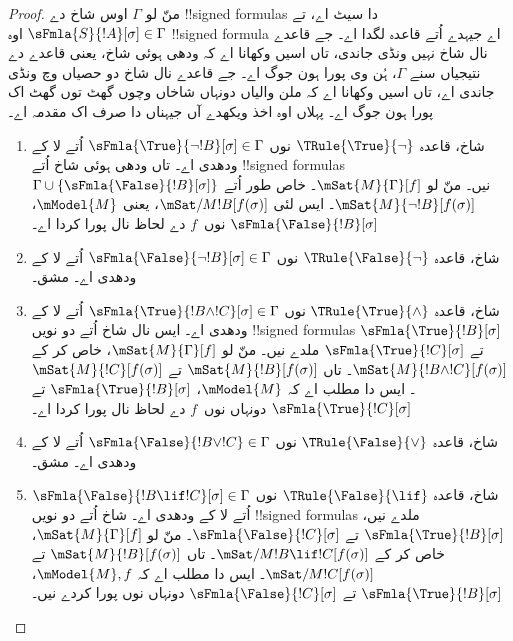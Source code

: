 \documentclass[../../../include/open-logic-section]{subfiles}
\begin{document}
\begin{proof}
منّ لو $\Gamma$ اوس شاخ دے !!{signed formula}s دا سیٹ اے، تے
$\sFmla{S}{!A}[\sigma] \in \Gamma$ اوہ !!{signed formula} اے جیہدے اُتے
قاعدہ لگدا اے۔ جے قاعدے نال شاخ نہیں ونڈی جاندی، تاں اسیں وکھانا اے
کہ ودھی ہوئی شاخ، یعنی قاعدے دے نتیجیاں سنے $\Gamma$، ہُن وی پورا ہون
جوگ اے۔ جے قاعدے نال شاخ دو حصیاں وچ ونڈی جاندی اے، تاں اسیں وکھانا
اے کہ ملن والیاں دونہاں شاخاں وچوں گھٹ توں گھٹ اک پورا ہون جوگ اے۔
پہلاں اوہ اخذ ویکھدے آں جیہناں دا صرف اک مقدمہ اے۔
\begin{enumerate}
\item شاخ، قاعدہ $\TRule{\True}{\lnot}$ نوں
  $\sFmla{\True}{\lnot !B}[\sigma] \in \Gamma$ اُتے لا کے ودھدی اے۔
  تاں ودھی ہوئی شاخ اُتے !!{signed formula}s
  $\Gamma \cup \{\sFmla{\False}{!B}[\sigma]\}$ نیں۔ منّ لو
  $\mSat{M}{\Gamma}[f]$۔ خاص طور اُتے $\mSat{M}{\lnot !B}[f(\sigma)]$۔
  ایس لئی $\mSat/{M}{!B}[f(\sigma)]$، یعنی $\mModel{M}$،
  $\sFmla{\False}{!B}[\sigma]$ نوں~$f$ دے لحاظ نال پورا کردا اے۔
\item شاخ، قاعدہ $\TRule{\False}{\lnot}$ نوں
  $\sFmla{\False}{\lnot !B}[\sigma] \in \Gamma$ اُتے لا کے ودھدی اے۔ مشق۔
\item شاخ، قاعدہ $\TRule{\True}{\land}$ نوں
  $\sFmla{\True}{!B \land !C}[\sigma] \in \Gamma$ اُتے لا کے ودھدی اے۔
  ایس نال شاخ اُتے دو نویں !!{signed formula}s
  $\sFmla{\True}{!B}[\sigma]$ تے $\sFmla{\True}{!C}[\sigma]$ ملدے نیں۔
  منّ لو $\mSat{M}{\Gamma}[f]$، خاص کر کے $\mSat{M}{!B \land
    !C}[f(\sigma)]$۔ تاں $\mSat{M}{!B}[f(\sigma)]$ تے
  $\mSat{M}{!C}[f(\sigma)]$۔ ایس دا مطلب اے کہ $\mModel{M}$،
  $\sFmla{\True}{!B}[\sigma]$ تے $\sFmla{\True}{!C}[\sigma]$
  دونہاں نوں~$f$ دے لحاظ نال پورا کردا اے۔
\item شاخ، قاعدہ $\TRule{\False}{\lor}$ نوں
  $\sFmla{\False}{!B \lor !C} \in \Gamma$ اُتے لا کے ودھدی اے۔ مشق۔
\item شاخ، قاعدہ $\TRule{\False}{\lif}$ نوں
  $\sFmla{\False}{!B \lif !C}[\sigma] \in \Gamma$ اُتے لا کے ودھدی اے۔
  شاخ اُتے دو نویں !!{signed formula}s ملدے نیں،
  $\sFmla{\True}{!B}[\sigma]$ تے $\sFmla{\False}{!C}[\sigma]$۔
  منّ لو $\mSat{M}{\Gamma}[f]$، خاص کر کے
  $\mSat/{M}{!B \lif !C}[f(\sigma)]$۔ تاں
  $\mSat{M}{!B}[f(\sigma)]$ تے $\mSat/{M}{!C}[f(\sigma)]$۔
  ایس دا مطلب اے کہ $\mModel{M}, f$،
  $\sFmla{\True}{!B}[\sigma]$ تے $\sFmla{\False}{!C}[\sigma]$ دونہاں نوں
  پورا کردے نیں۔

\end{enumerate}
\end{proof}
\end{document}
